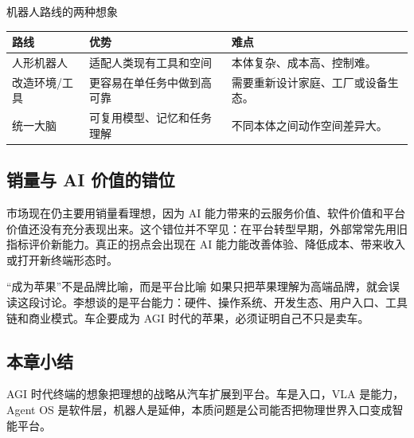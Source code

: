 \begin{knowledgebox}{机器人路线的两种想象}
\begin{tabularx}{\textwidth}{p{}p{}X}
\toprule
路线 & 优势 & 难点 \\
\midrule
人形机器人 & 适配人类现有工具和空间 & 本体复杂、成本高、控制难。 \\
改造环境/工具 & 更容易在单任务中做到高可靠 & 需要重新设计家庭、工厂或设备生态。 \\
统一大脑 & 可复用模型、记忆和任务理解 & 不同本体之间动作空间差异大。 \\
\bottomrule
\end{tabularx}
\end{knowledgebox}

\subsection{销量与 AI 价值的错位}

市场现在仍主要用销量看理想，因为 AI 能力带来的云服务价值、软件价值和平台价值还没有充分表现出来。这个错位并不罕见：在平台转型早期，外部常常先用旧指标评价新能力。真正的拐点会出现在 AI 能力能改善体验、降低成本、带来收入或打开新终端形态时。

\begin{warningbox}{“成为苹果”不是品牌比喻，而是平台比喻}
如果只把苹果理解为高端品牌，就会误读这段讨论。李想谈的是平台能力：硬件、操作系统、开发生态、用户入口、工具链和商业模式。车企要成为 AGI 时代的苹果，必须证明自己不只是卖车。
\end{warningbox}

\subsection{本章小结}

AGI 时代终端的想象把理想的战略从汽车扩展到平台。车是入口，VLA 是能力，Agent OS 是软件层，机器人是延伸，本质问题是公司能否把物理世界入口变成智能平台。

